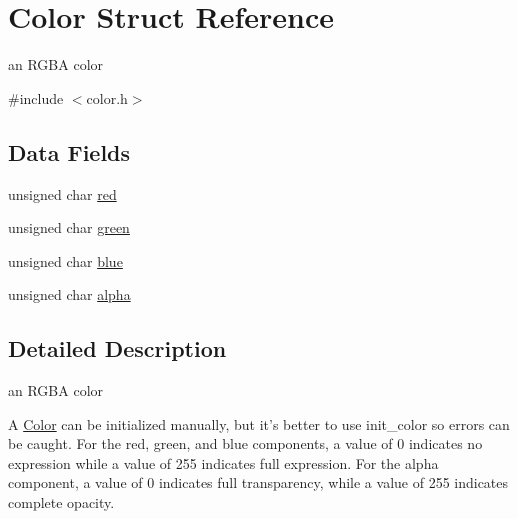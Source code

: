 \hypertarget{struct_color}{\section{Color Struct Reference}
\label{struct_color}
}


an R\-G\-B\-A color  




{\ttfamily \#include $<$color.\-h$>$}

\subsection*{Data Fields}
\begin{DoxyCompactItemize}
\item 
unsigned char \hyperlink{struct_color_a245f5a423cdaaaeff27047036c24b7ef}{red}
\item 
unsigned char \hyperlink{struct_color_a070831365fe6c626bc0020915a917081}{green}
\item 
unsigned char \hyperlink{struct_color_a5b425af958edb0e7835eb08daeb90e71}{blue}
\item 
unsigned char \hyperlink{struct_color_af485f621e60e201c55e7dae1966bb29f}{alpha}
\end{DoxyCompactItemize}


\subsection{Detailed Description}
an R\-G\-B\-A color 

A \hyperlink{struct_color}{Color} can be initialized manually, but it's better to use init\-\_\-color so errors can be caught. For the red, green, and blue components, a value of 0 indicates no expression while a value of 255 indicates full expression. For the alpha component, a value of 0 indicates full transparency, while a value of 255 indicates complete opacity. 

